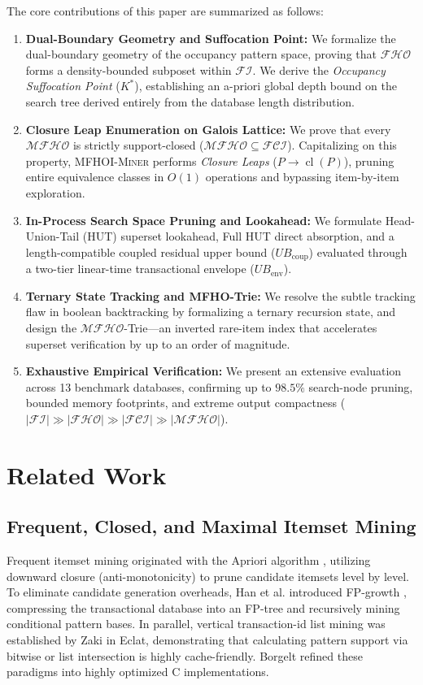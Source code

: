 \documentclass[runningheads,orivec]{llncs}
\newcommand{\cl}{\operatorname{cl}}
\newcommand{\FI}{\ensuremath{\mathcal{FI}}}
\newcommand{\FHO}{\ensuremath{\mathcal{FHO}}}
\newcommand{\FCI}{\ensuremath{\mathcal{FCI}}}
\newcommand{\MFHO}{\ensuremath{\mathcal{MFHO}}}
\newcommand{\MFHOI}{\ensuremath{\mathcal{MFHO}}}
\newcommand{\MFHOIMiner}{\textsc{MFHOI-Miner}}
\begin{document}
The core contributions of this paper are summarized as follows:
\begin{enumerate}
    \item \textbf{Dual-Boundary Geometry and Suffocation Point:} We formalize the dual-boundary geometry of the occupancy pattern space, proving that $\FHO$ forms a density-bounded subposet within $\FI$. We derive the \emph{Occupancy Suffocation Point} ($K^*$), establishing an a-priori global depth bound on the search tree derived entirely from the database length distribution.
    \item \textbf{Closure Leap Enumeration on Galois Lattice:} We prove that every $\MFHOI$ is strictly support-closed ($\MFHOI \subseteq \FCI$). Capitalizing on this property, \MFHOIMiner{} performs \emph{Closure Leaps} ($P \to \cl(P)$), pruning entire equivalence classes in $O(1)$ operations and bypassing item-by-item exploration.
    \item \textbf{In-Process Search Space Pruning and Lookahead:} We formulate Head-Union-Tail (HUT) superset lookahead, Full HUT direct absorption, and a length-compatible coupled residual upper bound ($UB_{\mathrm{coup}}$) evaluated through a two-tier linear-time transactional envelope ($UB_{\mathrm{env}}$).
    \item \textbf{Ternary State Tracking and MFHO-Trie:} We resolve the subtle tracking flaw in boolean backtracking by formalizing a ternary recursion state, and design the \MFHO{}-Trie—an inverted rare-item index that accelerates superset verification by up to an order of magnitude.
    \item \textbf{Exhaustive Empirical Verification:} We present an extensive evaluation across 13 benchmark databases, confirming up to $98.5\%$ search-node pruning, bounded memory footprints, and extreme output compactness ($\vert\FI\vert \gg \vert\FHO\vert \gg \vert\FCI\vert \gg \vert\MFHOI\vert$).
\end{enumerate}

\section{Related Work}
\label{sec:related}

\subsection{Frequent, Closed, and Maximal Itemset Mining}
Frequent itemset mining originated with the Apriori algorithm \cite{agrawal1994fast}, utilizing downward closure (anti-monotonicity) to prune candidate itemsets level by level. To eliminate candidate generation overheads, Han et al. introduced FP-growth \cite{han2000mining}, compressing the transactional database into an FP-tree and recursively mining conditional pattern bases. In parallel, vertical transaction-id list mining was established by Zaki \cite{zaki2000scalable} in Eclat, demonstrating that calculating pattern support via bitwise or list intersection is highly cache-friendly. Borgelt \cite{borgelt2003fimi} refined these paradigms into highly optimized C implementations.
\end{document}
